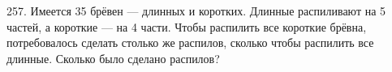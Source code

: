 257. Имеется 35 брёвен --- длинных и коротких. Длинные распиливают на 5 частей, а короткие --- на 4 части. Чтобы распилить все короткие брёвна, потребовалось сделать столько же распилов, сколько чтобы распилить все длинные. Сколько было сделано распилов?\\
